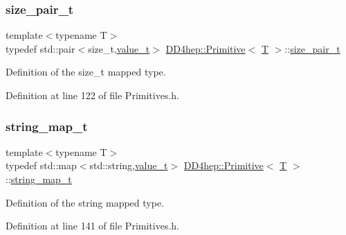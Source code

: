\subsubsection{\texorpdfstring{size\+\_\+pair\+\_\+t}{size\_pair\_t}}
{\footnotesize\ttfamily template$<$typename T$>$ \\
typedef std\+::pair$<$size\+\_\+t,\hyperlink{struct_d_d4hep_1_1_primitive_a0639e73bb8f07f99c2d8401f807a7af6}{value\+\_\+t}$>$ \hyperlink{struct_d_d4hep_1_1_primitive}{D\+D4hep\+::\+Primitive}$<$ \hyperlink{class_t}{T} $>$\+::\hyperlink{struct_d_d4hep_1_1_primitive_a330a7f3f969e59b48e16c6054668f7d3}{size\+\_\+pair\+\_\+t}}



Definition of the size\+\_\+t mapped type. 



Definition at line 122 of file Primitives.\+h.

\hypertarget{struct_d_d4hep_1_1_primitive_a27b9d11befb4af57c39af66b69efdbb4}{}\label{struct_d_d4hep_1_1_primitive_a27b9d11befb4af57c39af66b69efdbb4} 
\subsubsection{\texorpdfstring{string\+\_\+map\+\_\+t}{string\_map\_t}}
{\footnotesize\ttfamily template$<$typename T$>$ \\
typedef std\+::map$<$std\+::string,\hyperlink{struct_d_d4hep_1_1_primitive_a0639e73bb8f07f99c2d8401f807a7af6}{value\+\_\+t}$>$ \hyperlink{struct_d_d4hep_1_1_primitive}{D\+D4hep\+::\+Primitive}$<$ \hyperlink{class_t}{T} $>$\+::\hyperlink{struct_d_d4hep_1_1_primitive_a27b9d11befb4af57c39af66b69efdbb4}{string\+\_\+map\+\_\+t}}



Definition of the string mapped type. 



Definition at line 141 of file Primitives.\+h.

\hypertarget{struct_d_d4hep_1_1_primitive_ab799730f156ae3e2ba15f621289c0e99}{}\label{struct_d_d4hep_1_1_primitive_ab799730f156ae3e2ba15f621289c0e99} 
